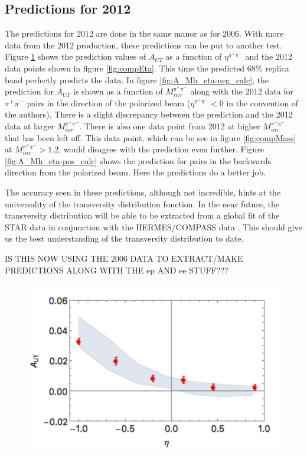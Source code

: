 \documentclass[abstract = on,listof=totoc, bibliography=totoc]{scrreprt}
\newcommand{\mpair}{M_{inv}^{\pi^+\pi^-}}
\newcommand{\etapair}{\eta^{\pi^+\pi^-}}
\newcommand{\pip}{\pi^+}
\newcommand{\pim}{\pi^-}
\newcommand{\pair}{$\pip\pim$ }
\begin{document}
\FloatBarrier
\subsection{Predictions for 2012}

The predictions for 2012 are done in the same manor as for 2006. With more data from the 2012 production, these predictions can be put to another test. Figure \ref{fig:A_eta_calc} shows the prediction values of $A_{UT}$ as a function of $\etapair$ and the 2012 data points shown in figure \ref{fig:compEta}. This time the predicted 68\% replica band perfectly predicts the data. In figure \ref{fig:A_Mh_eta-neg_calc}, the prediction for $A_{UT}$ is shown as a function of $\mpair$ along with the 2012 data for \pair pairs in the direction of the polarized beam ($\etapair < 0$ in the convention of the authors). There is a slight discrepancy between the prediction and the 2012 data at larger $\mpair$. There is also one data point from 2012 at higher $\mpair$ that has been left off. This data point, which can be see in figure \ref{fig:compMass} at $\mpair > 1.2$, would disagree with the prediction even further. Figure \ref{fig:A_Mh_eta-pos_calc} shows the prediction for pairs in the backwards direction from the polarized beam. Here the predictions do a better job.    

The accuracy seen in these predictions, although not incredible, hints at the universality of the transversity distribution function. In the near future, the transversity distribution will be able to be extracted from a global fit of the STAR data in conjunction with the HERMES/COMPASS data \cite{univTrans}. This should give us the best understanding of the transversity distribution to date.  


IS THIS NOW USING THE 2006 DATA TO EXTRACT/MAKE PREDICTIONS ALONG WITH THE ep AND ee STUFF???


\begin{figure}
\begin{center}
\includegraphics[width = .6\textwidth]{A_eta}
\caption[]{}
\label{fig:A_eta_calc}
\end{center}
\end{figure}
\end{document}
